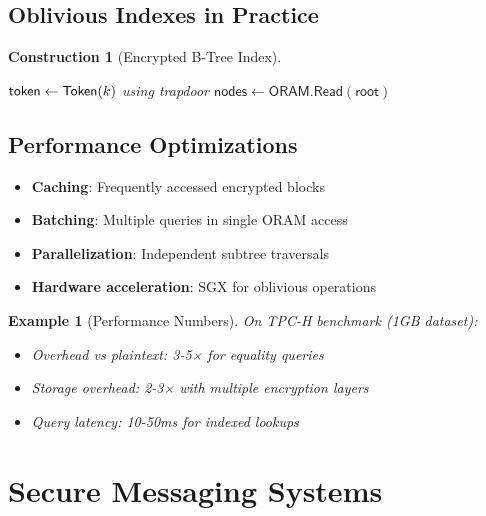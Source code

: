 \documentclass[11pt,final]{article}
\newtheorem{example}[theorem]{Example}
\newtheorem{construction}[theorem]{Construction}
\begin{document}
\subsection{Oblivious Indexes in Practice}

\begin{construction}[Encrypted B-Tree Index]
\begin{algorithm}[H]
\caption{Oblivious Database Index}
$\mathsf{token} \gets \mathsf{Token}(k)$ using trapdoor\;
$\mathsf{nodes} \gets \mathsf{ORAM.Read}(\mathsf{root})$\;
\end{algorithm}
\end{construction}

\subsection{Performance Optimizations}

\begin{itemize}
    \item \textbf{Caching}: Frequently accessed encrypted blocks
    \item \textbf{Batching}: Multiple queries in single ORAM access
    \item \textbf{Parallelization}: Independent subtree traversals
    \item \textbf{Hardware acceleration}: SGX for oblivious operations
\end{itemize}

\begin{example}[Performance Numbers]
On TPC-H benchmark (1GB dataset):
\begin{itemize}
    \item Overhead vs plaintext: 3-5× for equality queries
    \item Storage overhead: 2-3× with multiple encryption layers
    \item Query latency: 10-50ms for indexed lookups
\end{itemize}
\end{example}

\section{Secure Messaging Systems}
\end{document}
